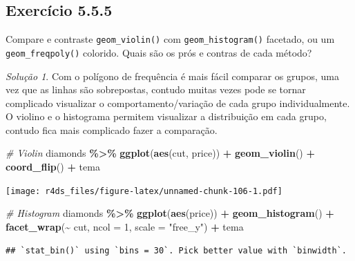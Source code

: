 \documentclass[
]{latex/krantz}
\newenvironment{Shaded}{\begin{snugshade}}{\end{snugshade}}
\newcommand{\AttributeTok}[1]{\textcolor[rgb]{0.13,0.29,0.53}{#1}}
\newcommand{\CommentTok}[1]{\textcolor[rgb]{0.56,0.35,0.01}{\textit{#1}}}
\newcommand{\DecValTok}[1]{\textcolor[rgb]{0.00,0.00,0.81}{#1}}
\newcommand{\FunctionTok}[1]{\textcolor[rgb]{0.13,0.29,0.53}{\textbf{#1}}}
\newcommand{\NormalTok}[1]{#1}
\newcommand{\SpecialCharTok}[1]{\textcolor[rgb]{0.81,0.36,0.00}{\textbf{#1}}}
\newcommand{\StringTok}[1]{\textcolor[rgb]{0.31,0.60,0.02}{#1}}
\theoremstyle{definition}
\theoremstyle{definition}
\theoremstyle{definition}
\theoremstyle{definition}
\theoremstyle{remark}
\newtheorem*{solution}{Solução}
\begin{document}
\hypertarget{exr5-5-5}{%
\subsection*{Exercício 5.5.5}\label{exr5-5-5}}

Compare e contraste \texttt{geom\_violin()} com \texttt{geom\_histogram()} facetado, ou um \texttt{geom\_freqpoly()} colorido. Quais são os prós e contras de cada método?

\begin{solution}
Com o polígono de frequência é mais fácil comparar os grupos, uma vez que as linhas são sobrepostas, contudo muitas vezes pode se tornar complicado visualizar o comportamento/variação de cada grupo individualmente. O violino e o histograma permitem visualizar a distribuição em cada grupo, contudo fica mais complicado fazer a comparação.

\begin{Shaded}
\begin{Highlighting}[]
\CommentTok{\# Violin}
\NormalTok{diamonds }\SpecialCharTok{\%\textgreater{}\%}
    \FunctionTok{ggplot}\NormalTok{(}\FunctionTok{aes}\NormalTok{(cut, price)) }\SpecialCharTok{+}
        \FunctionTok{geom\_violin}\NormalTok{() }\SpecialCharTok{+}
        \FunctionTok{coord\_flip}\NormalTok{() }\SpecialCharTok{+}
\NormalTok{        tema}
\end{Highlighting}
\end{Shaded}

\texttt{[image: r4ds\_files/figure-latex/unnamed-chunk-106-1.pdf]}

\begin{Shaded}
\begin{Highlighting}[]
\CommentTok{\# Histogram}
\NormalTok{diamonds }\SpecialCharTok{\%\textgreater{}\%}
    \FunctionTok{ggplot}\NormalTok{(}\FunctionTok{aes}\NormalTok{(price)) }\SpecialCharTok{+}
        \FunctionTok{geom\_histogram}\NormalTok{() }\SpecialCharTok{+}
        \FunctionTok{facet\_wrap}\NormalTok{(}\SpecialCharTok{\textasciitilde{}}\NormalTok{ cut, }\AttributeTok{ncol =} \DecValTok{1}\NormalTok{, }\AttributeTok{scale =} \StringTok{"free\_y"}\NormalTok{) }\SpecialCharTok{+}
\NormalTok{        tema}
\end{Highlighting}
\end{Shaded}

\begin{verbatim}
## `stat_bin()` using `bins = 30`. Pick better value with `binwidth`.
\end{verbatim}


\end{solution}
\end{document}
